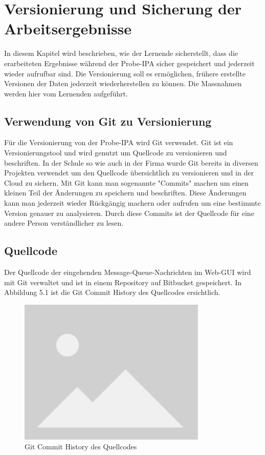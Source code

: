 \chapter{Versionierung und Sicherung der Arbeitsergebnisse}\label{ch:versionierung-und-sicherung-der-arbeitsergebnisse}
In diesem Kapitel wird beschrieben, wie der Lernende sicherstellt, dass die erarbeiteten Ergebnisse während der Probe-IPA sicher gespeichert und jederzeit wieder aufrufbar sind. Die Versionierung soll es ermöglichen, frühere erstellte Versionen der Daten jederzeit wiederherstellen zu können. Die Massnahmen werden hier vom Lernenden aufgeführt.

\section{Verwendung von Git zu Versionierung}
Für die Versionierung von der Probe-IPA wird Git verwendet. Git ist ein Versionierungstool und wird genutzt um Quellcode zu versionieren und beschriften. In der Schule so wie auch in der Firma wurde Git bereits in diversen Projekten verwendet um den Quellcode übersichtlich zu versionieren und in der Cloud zu sichern. Mit Git kann man sogenannte "Commits" machen um einen kleinen Teil der Änderungen zu speichern und beschriften. Diese Änderungen kann man jederzeit wieder Rückgängig machern oder aufrufen um eine bestimmte Version genauer zu analysieren. Durch diese Commits ist der Quellcode für eine andere Person verständlicher zu lesen.

\section{Quellcode}
Der Quellcode der eingehenden Message-Queue-Nachrichten im Web-GUI wird mit Git verwaltet und ist in einem Repository auf Bitbucket gespeichert. In Abbildung 5.1 ist die Git Commit History des Quellcodes ersichtlich.

\begin{figure}[H]
	\begin{center}
		\includegraphics[width=0.8\textwidth]{ressourcen/placeholder}
		\caption[Git Commit History des Quellcodes]{Git Commit History des Quellcodes}\label{fig:Git-Commit-History-des-Quellcodes}
	\end{center}
\end{figure}

